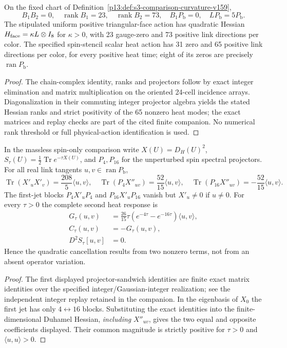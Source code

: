 \documentclass[12pt,a4paper]{article}
\begin{document}
\begin{proposition}
\label{p13:prop:s3-comparison-rank-v159}
On the fixed chart of Definition~\ref{p13:def:s3-comparison-curvature-v159},
\[
B_1B_2=0,\quad
\operatorname{rank}B_1=23,\quad
\operatorname{rank}B_2=73,\quad
B_1P_{\mathrm b}=0,\quad LP_{\mathrm b}=5P_{\mathrm b}.
\]
The stipulated uniform positive triangular-face action has quadratic
Hessian $H_{\rm face}=\kappa L\otimes I_8$ for $\kappa>0$,
with 23 gauge-zero and 73 positive link directions per color.
The specified spin-stencil scalar heat action has 31 zero and
65 positive link directions per color, for every positive heat time;
eight of its zeros are precisely $\operatorname{ran}P_{\mathrm b}$.
\end{proposition}
\begin{proof}
The chain-complex identity, ranks and projectors follow by exact
integer elimination and matrix multiplication on the oriented
24-cell incidence arrays.  Diagonalization in their commuting
integer projector algebra yields the stated Hessian ranks and
strict positivity of the 65 nonzero heat modes; the exact matrices
and replay checks are part of the cited finite companion.
No numerical rank threshold or full physical-action identification
is used.
\end{proof}

\begin{theorem}
\label{p13:thm:s3-eight-mode-contact-v159}
In the massless spin-only comparison write $X(U)=D_H(U)^2$,
$S_\tau(U)=\tfrac12\operatorname{Tr}e^{-\tau X(U)}$,
and $P_4,P_{16}$ for the unperturbed spin spectral projectors.
For all real link tangents $u,v\in\operatorname{ran}P_{\mathrm b}$,
\[
\operatorname{Tr}(X'_uX'_v)=\frac{208}{5}\langle u,v\rangle,\quad
\operatorname{Tr}(P_4X''_{uv})=\frac{52}{15}\langle u,v\rangle,\quad
\operatorname{Tr}(P_{16}X''_{uv})=-\frac{52}{15}\langle u,v\rangle.
\]
The first-jet blocks $P_4X'_uP_4$ and
$P_{16}X'_uP_{16}$ vanish but $X'_u\ne0$ if $u\ne0$.
For every $\tau>0$ the complete second heat response is
\[
\begin{aligned}
G_\tau(u,v)&=\frac{26}{15}\tau
  (e^{-4\tau}-e^{-16\tau})\langle u,v\rangle,\\
C_\tau(u,v)&=-G_\tau(u,v),\\
\boxed{D^2S_\tau[u,v]}&=0.
\end{aligned}
\]
Hence the quadratic cancellation results from two nonzero terms,
not from an absent operator variation.
\end{theorem}
\begin{proof}
The first displayed projector-sandwich identities are finite exact
matrix identities over the specified integer/Gaussian-integer
realization; see the independent integer replay retained in the
companion.  In the eigenbasis of $X_0$ the first jet has only
$4\leftrightarrow16$ blocks.  Substituting the exact identities
into the finite-dimensional Duhamel Hessian, \emph{including}
$X''_{uv}$, gives the two equal and opposite coefficients displayed.
Their common magnitude is strictly positive for $\tau>0$ and
$\langle u,u\rangle>0$.
\end{proof}
\end{document}

